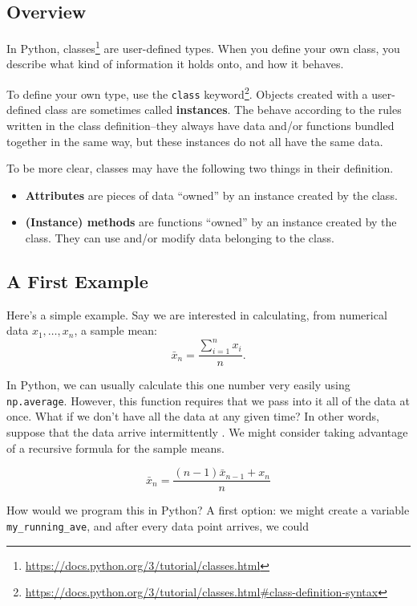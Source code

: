 \documentclass[
  12pt,
]{krantz}
\renewcommand{\href}[2]{#2\footnote{\url{#1}}}
\begin{document}
\hypertarget{overview}{%
\subsection{Overview}\label{overview}}

In Python, \href{https://docs.python.org/3/tutorial/classes.html}{classes} are user-defined types. When you define your own class, you describe what kind of information it holds onto, and how it behaves.

To define your own type, use the \href{https://docs.python.org/3/tutorial/classes.html\#class-definition-syntax}{\texttt{class} keyword}. Objects created with a user-defined class are sometimes called \textbf{instances}. The behave according to the rules written in the class definition--they always have data and/or functions bundled together in the same way, but these instances do not all have the same data.

To be more clear, classes may have the following two things in their definition.

\begin{itemize}
\item
  \textbf{Attributes} are pieces of data ``owned'' by an instance created by the class.
\item
  \textbf{(Instance) methods} are functions ``owned'' by an instance created by the class. They can use and/or modify data belonging to the class.
\end{itemize}

\hypertarget{a-first-example}{%
\subsection{A First Example}\label{a-first-example}}

Here's a simple example. Say we are interested in calculating, from numerical data \(x_1, \ldots, x_n\), a sample mean:
\[
\bar{x}_n = \frac{\sum_{i=1}^n x_i}{n}.
\]

In Python, we can usually calculate this one number very easily using \texttt{np.average}. However, this function requires that we pass into it all of the data at once. What if we don't have all the data at any given time? In other words, suppose that the data arrive intermittently
.
We might consider taking advantage of a recursive formula for the sample means.

\[
\bar{x}_n =  \frac{(n-1) \bar{x}_{n-1} + x_n}{n}
\]

How would we program this in Python? A first option: we might create a variable \texttt{my\_running\_ave}, and after every data point arrives, we could
\end{document}
